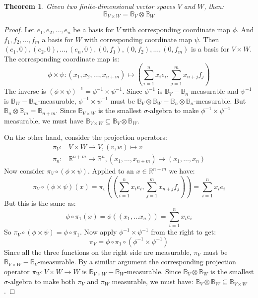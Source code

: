 \documentclass[12pt, a4paper]{article}
\newtheorem{theorem}{Theorem}[section]
\numberwithin{equation}{section}
\begin{document}
\begin{theorem}
Given two finite-dimensional vector spaces $V$ and $W$, then:
\begin{equation}
\mathbb{B}_{V\times W}=\mathbb{B}_V\otimes\mathbb{B}_W
\end{equation}
\end{theorem}
\begin{proof}
Let $e_1, e_2,\ldots, e_n$ be a basis for $V$ with corresponding coordinate map $\phi$. And $f_1, f_2,\ldots, f_m$ a basis for $W$ with corresponding coordinate map $\psi$. Then $(e_1, 0), (e_2, 0),\ldots,(e_n,0),(0, f_1), (0, f_2),\ldots,(0,f_m)$ is a basis for $V\times W$. The corresponding coordinate map is:
\begin{equation}
\phi\times\psi: (x_1, x_2,\ldots,x_{n+m})\mapsto\left(\sum_{i=1}^n x_i e_i,\sum_{j=1}^m x_{n+j}f_j\right)
\end{equation}
The inverse is $(\phi\times\psi)^{-1}=\phi^{-1}\times\psi^{-1}$. Since $\phi^{-1}$ is $\mathbb{B}_V-\mathbb{B}_n$-measurable and $\psi^{-1}$ is $\mathbb{B}_W-\mathbb{B}_m$-measurable, $\phi^{-1}\times\psi^{-1}$ must be $\mathbb{B}_V\otimes\mathbb{B}_W-\mathbb{B}_n\otimes\mathbb{B}_n$-measurable. But $\mathbb{B}_n\otimes\mathbb{B}_m=\mathbb{B}_{n+m}$. Since $\mathbb{B}_{V\times W}$ is the smallest $\sigma$-algebra to make $\phi^{-1}\times\psi^{-1}$ measurable, we must have $\mathbb{B}_{V\times W}\subseteq\mathbb{B}_V\otimes\mathbb{B}_W$.

On the other hand, consider the projection operators:
\begin{align}
\pi_V:& V\times W\rightarrow V, (v,w)\mapsto v\\
\pi_n:& \mathbb{R}^{n+m}\rightarrow\mathbb{R}^n, (x_1,\ldots,x_{n+m})\mapsto(x_1,\ldots,x_n)
\end{align}
Now consider $\pi_V\circ(\phi\times\psi)$. Applied to an $x\in\mathbb{R}^{n+m}$ we have:
\begin{equation}
\pi_V\circ(\phi\times\psi)(x)=\pi_v\left(\left(\sum_{i=1}^n x_i e_i,\sum_{j=1}^m x_{n+j}f_j\right)\right)=\sum_{i=1}^n x_i e_i
\end{equation}
But this is the same as:
\begin{equation}
\phi\circ\pi_1(x)=\phi\left((x_1,\ldots x_n)\right)=\sum_{i=1}^n x_i e_i
\end{equation}
So $\pi_V\circ(\phi\times\psi)=\phi\circ\pi_1$. Now apply $\phi^{-1}\times\psi^{-1}$ from the right to get:
\begin{equation}
\pi_V=\phi\circ\pi_1\circ(\phi^{-1}\times\psi^{-1})
\end{equation}
Since all the three functions on the right side are measurable, $\pi_V$ must be $\mathbb{B}_{V\times W}-\mathbb{B}_V$-measurable. By a similar argument the corresponding projection operator $\pi_W: V\times W\rightarrow W$ is $\mathbb{B}_{V\times W}-\mathbb{B}_W$-measurable. Since $\mathbb{B}_V\otimes\mathbb{B}_W$ is the smallest $\sigma$-algebra to make both $\pi_V$ and $\pi_W$ measurable, we must have: $\mathbb{B}_V\otimes\mathbb{B}_W\subseteq\mathbb{B}_{V\times W}$.
\end{proof}
\end{document}

